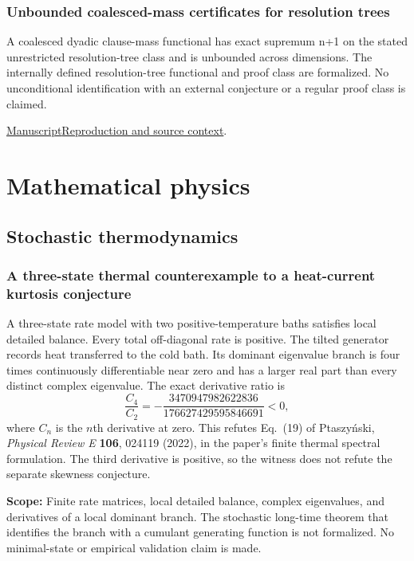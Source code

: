\documentclass[11pt,a4paper]{article}
\begin{document}
\subsubsection{Unbounded coalesced-mass certificates for resolution trees}

A coalesced dyadic clause-mass functional has exact supremum n+1 on the stated unrestricted resolution-tree class and is unbounded across dimensions. The internally defined resolution-tree functional and proof class are formalized. No unconditional identification with an external conjecture or a regular proof class is claimed.

\href{https://github.com/dvgyl/math-and-theory/blob/main/papers/theoretical-computer-science/kunisky/paper.pdf}{Manuscript}\quad\href{https://github.com/dvgyl/math-and-theory/blob/main/papers/theoretical-computer-science/kunisky/README.md}{Reproduction and source context}.

\section{Mathematical physics}

\subsection{Stochastic thermodynamics}

\subsubsection{A three-state thermal counterexample to a heat-current kurtosis conjecture}

A three-state rate model with two positive-temperature baths satisfies local detailed balance. Every total off-diagonal rate is positive. The tilted generator records heat transferred to the cold bath. Its dominant eigenvalue branch is four times continuously differentiable near zero and has a larger real part than every distinct complex eigenvalue. The exact derivative ratio is
\[
\frac{C_4}{C_2}=-\frac{3470947982622836}{176627429595846691}<0,
\]
where $C_n$ is the $n$th derivative at zero. This refutes Eq.~(19) of Ptaszy\'nski, \emph{Physical Review E} \textbf{106}, 024119 (2022), in the paper's finite thermal spectral formulation. The third derivative is positive, so the witness does not refute the separate skewness conjecture.

\par\smallskip
\noindent\textbf{Scope:} Finite rate matrices, local detailed balance, complex eigenvalues, and derivatives of a local dominant branch. The stochastic long-time theorem that identifies the branch with a cumulant generating function is not formalized. No minimal-state or empirical validation claim is made.
\end{document}
